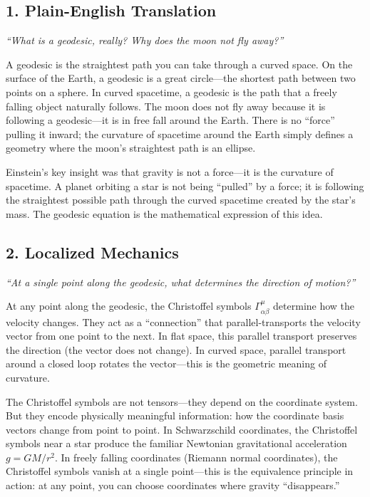 \documentclass[11pt,openright]{book}
\begin{document}
\subsection*{1. Plain-English Translation}
\textit{``What is a geodesic, really? Why does the moon not fly away?''}

A geodesic is the straightest path you can take through a curved space. On the surface of the Earth, a geodesic is a great circle---the shortest path between two points on a sphere. In curved spacetime, a geodesic is the path that a freely falling object naturally follows. The moon does not fly away because it is following a geodesic---it is in free fall around the Earth. There is no ``force'' pulling it inward; the curvature of spacetime around the Earth simply defines a geometry where the moon's straightest path is an ellipse.

Einstein's key insight was that gravity is not a force---it is the curvature of spacetime. A planet orbiting a star is not being ``pulled'' by a force; it is following the straightest possible path through the curved spacetime created by the star's mass. The geodesic equation is the mathematical expression of this idea.

\subsection*{2. Localized Mechanics}
\textit{``At a single point along the geodesic, what determines the direction of motion?''}

At any point along the geodesic, the Christoffel symbols $\Gamma^\mu_{\alpha\beta}$ determine how the velocity changes. They act as a ``connection'' that parallel-transports the velocity vector from one point to the next. In flat space, this parallel transport preserves the direction (the vector does not change). In curved space, parallel transport around a closed loop rotates the vector---this is the geometric meaning of curvature.

The Christoffel symbols are not tensors---they depend on the coordinate system. But they encode physically meaningful information: how the coordinate basis vectors change from point to point. In Schwarzschild coordinates, the Christoffel symbols near a star produce the familiar Newtonian gravitational acceleration $g = GM/r^2$. In freely falling coordinates (Riemann normal coordinates), the Christoffel symbols vanish at a single point---this is the equivalence principle in action: at any point, you can choose coordinates where gravity ``disappears.''
\end{document}
